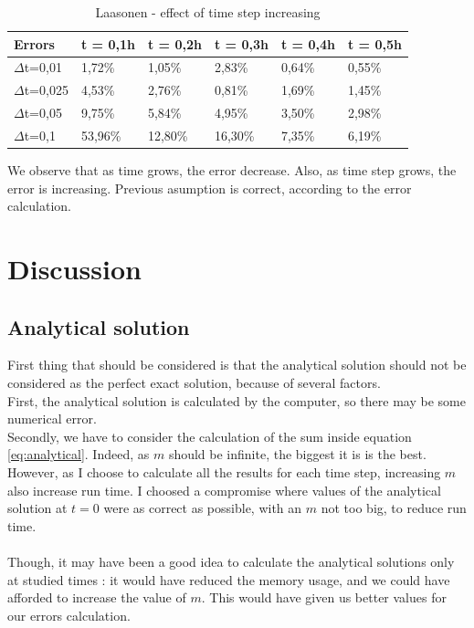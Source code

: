 \documentclass{article}
\begin{document}
        \begin{table}[H]
            \centering
            \caption{Laasonen - effect of time step increasing }
            \label{table:laas}
            \begin{tabular}{|l|l|l|l|l|l|}
                \hline
                Errors    & t = 0,1h & t = 0,2h  & t = 0,3h  & t = 0,4h & t = 0,5h \\ \hline
                $\Delta$t=0,01  & 1,72\%   & 1,05\%  & 2,83\%  & 0,64\% & 0,55\% \\ \hline
                $\Delta$t=0,025 & 4,53\%   & 2,76\%  & 0,81\%  & 1,69\% & 1,45\% \\ \hline
                $\Delta$t=0,05  & 9,75\%   & 5,84\%  & 4,95\%  & 3,50\% & 2,98\% \\ \hline
                $\Delta$t=0,1   & 53,96\%  & 12,80\% & 16,30\% & 7,35\% & 6,19\% \\ \hline
            \end{tabular}
        \end{table}

        We observe that as time grows, the error decrease. Also, as time step grows, the error is increasing.
        Previous asumption is correct, according to the error calculation.
    \newpage
    \section{Discussion}
        \subsection{Analytical solution}
            First thing that should be considered is that the analytical solution should not be
            considered as the perfect exact solution, because of several factors.
            \\
            First, the analytical solution is calculated by the computer, so there may be some numerical error.
            \\
            Secondly, we have to consider the calculation of the sum inside equation \eqref{eq:analytical}.
            Indeed, as $m$ should be infinite, the biggest it is is the best. However, as I choose to calculate
            all the results for each time step, increasing $m$ also increase run time. I choosed a compromise
            where values of the analytical solution at $t=0$ were as correct as possible, with an $m$ not too big,
            to reduce run time.
            \\
            \\
            Though, it may have been a good idea to calculate the analytical solutions only at studied times : 
            it would have reduced the memory usage, and we could have afforded to increase the value of $m$.
            This would have given us better values for our errors calculation.
\end{document}
